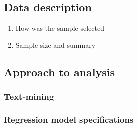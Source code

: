 \subsection{Data description}
\label{sec:data-description}
\begin{enumerate}
\item How was the sample selected
\item Sample size and summary
\end{enumerate}

\subsection{Approach to analysis}
\label{sec:approach-analysis}

\subsubsection{Text-mining}
\label{sec:text-mining}

\subsubsection{Regression model specifications}
\label{sec:model-selection}


